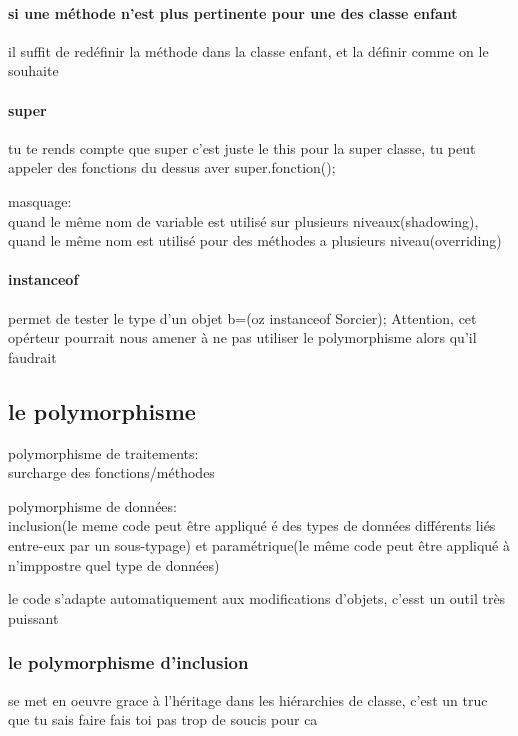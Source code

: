 \documentclass[a4paper,10pt]{article}
\begin{document}
\paragraph{si une méthode n'est plus pertinente pour une des classe enfant}
il suffit de redéfinir la méthode dans la classe enfant, et la définir comme on le souhaite
\paragraph{super}
tu te rends compte que super c'est juste le this pour la super classe, tu peut appeler des fonctions du dessus aver super.fonction();
\begin{description}
 \item masquage:\\{quand le même nom de variable est utilisé sur plusieurs niveaux(shadowing), quand le même nom est utilisé pour des méthodes a plusieurs niveau(overriding)}
\end{description}

\paragraph{instanceof}
permet de tester le type d'un objet
\newline
b=(oz instanceof Sorcier);
\newline
Attention, cet opérteur pourrait nous amener à ne pas utiliser le polymorphisme alors qu'il faudrait
\subsection{le polymorphisme}

\begin{description}
 \item polymorphisme de traitements:\\{surcharge des fonctions/méthodes}
 \item polymorphisme de données:\\{inclusion(le meme code peut être appliqué é des types de données différents liés entre-eux par un sous-typage) et paramétrique(le même code peut être appliqué à n'imppostre quel type de données)}
\end{description}
le code s'adapte automatiquement aux modifications d'objets, c'esst un outil très puissant
\subsubsection{le polymorphisme d'inclusion}
se met en oeuvre grace à l'héritage dans les hiérarchies de classe, c'est un truc que tu sais faire fais toi pas trop de soucis pour ca
\end{document}
